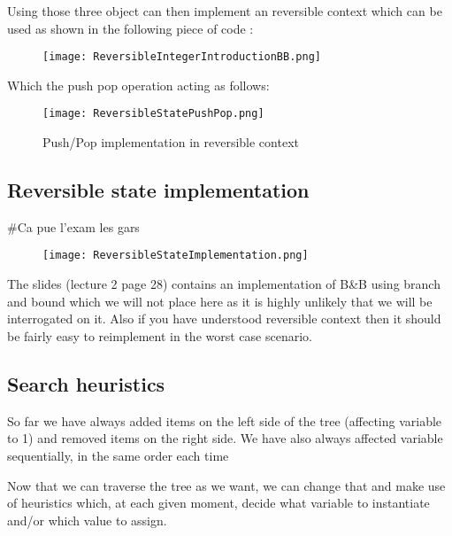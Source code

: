 Using those three object can then implement an reversible context 
which can be used as shown in the following piece of code :

\begin{figure}[!ht]
    \centering
    \texttt{[image: ReversibleIntegerIntroductionBB.png]}
    \label{fig:Knapsack_example}
\end{figure}
\FloatBarrier

Which the push pop operation acting as follows:

\begin{figure}[!ht]
    \centering
    \texttt{[image: ReversibleStatePushPop.png]}
    \caption{Push/Pop implementation in reversible context}
    \label{fig:Knapsack_example}
\end{figure}
\FloatBarrier

\subsection{Reversible state implementation}

\#Ca pue l'exam les gars

\begin{figure}[!ht]
    \centering
    \texttt{[image: ReversibleStateImplementation.png]}
    \label{fig:Knapsack_example}
\end{figure}
\FloatBarrier

The slides (lecture 2 page 28) contains an implementation of B\&B using branch and bound
which we will not place here as it is highly unlikely that we will be interrogated on it.
Also if you have understood reversible context then it should be fairly easy 
to reimplement in the worst case scenario.

\subsection{Search heuristics}

So far we have always added items on the left side of the tree (affecting variable to 1)
and removed items on the right side. We have also always affected variable sequentially, 
in the same order each time\newline

Now that we can traverse the tree as we want, we can change that and make use of 
heuristics which, at each given moment, decide what variable to instantiate 
and/or which value to assign. 
\newline

